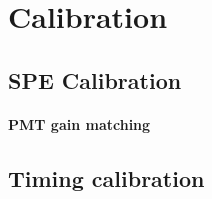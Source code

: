 \section{Calibration}

\subsection{SPE Calibration}
\paragraph{PMT gain matching}
\subsection{Timing calibration}



